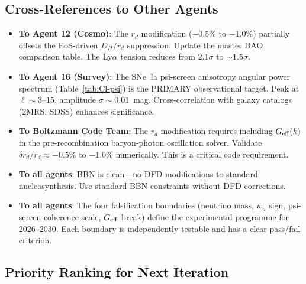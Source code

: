 \documentclass[11pt,a4paper]{article}
\newcommand{\Geff}{G_{\rm eff}}
\begin{document}
\subsection{Cross-References to Other Agents}

\begin{itemize}
\item \textbf{To Agent 12 (Cosmo)}: The $r_d$ modification
  ($-0.5\%$ to $-1.0\%$) partially offsets the EoS-driven
  $D_H/r_d$ suppression.  Update the master BAO comparison table.
  The Ly$\alpha$ tension reduces from $2.1\sigma$ to $\sim 1.5\sigma$.

\item \textbf{To Agent 16 (Survey)}: The SNe~Ia psi-screen
  anisotropy angular power spectrum (Table~\ref{tab:Cl-psi}) is
  the PRIMARY observational target.  Peak at $\ell \sim 3$--$15$,
  amplitude $\sigma \sim 0.01$~mag.  Cross-correlation with
  galaxy catalogs (2MRS, SDSS) enhances significance.

\item \textbf{To Boltzmann Code Team}: The $r_d$ modification
  requires including $\Geff(k)$ in the pre-recombination
  baryon-photon oscillation solver.  Validate $\delta r_d/r_d
  \approx -0.5\%$ to $-1.0\%$ numerically.  This is a critical
  code requirement.

\item \textbf{To all agents}: BBN is clean---no DFD modifications
  to standard nucleosynthesis.  Use standard BBN constraints
  without DFD corrections.

\item \textbf{To all agents}: The four falsification boundaries
  (neutrino mass, $w_a$ sign, psi-screen coherence scale, $\Geff$
  break) define the experimental programme for 2026--2030.  Each
  boundary is independently testable and has a clear
  pass/fail criterion.
\end{itemize}


\subsection{Priority Ranking for Next Iteration}
\end{document}

